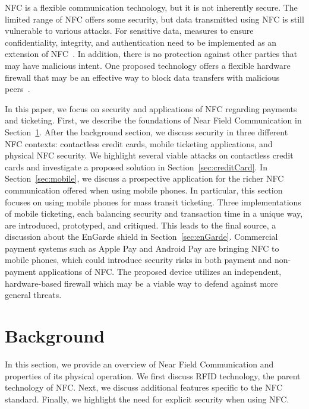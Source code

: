\documentclass{sig-alternate}
\begin{document}
NFC is a flexible communication technology, but it is not inherently secure. The limited range of NFC offers some security, but data transmitted using NFC is still vulnerable to various attacks. For sensitive data, measures to ensure confidentiality, integrity, and authentication need to be implemented as an extension of NFC~\cite{CC2016}. In addition, there is no protection against other parties that may have malicious intent. One proposed technology offers a flexible hardware firewall that may be an effective way to block data transfers with malicious peers~\cite{Gum2013}.

In this paper, we focus on security and applications of NFC regarding payments and ticketing. First, we describe the foundations of Near Field Communication in Section~\ref{sec:background}. After the background section, we discuss security in three different NFC contexts: contactless credit cards, mobile ticketing applications, and physical NFC security.
We highlight several viable attacks on
contactless credit cards and investigate a proposed solution in Section~\ref{sec:creditCard}.
In Section~\ref{sec:mobile}, we discuss a prospective application for the richer NFC communication offered when using mobile phones. In particular, this section focuses on  using mobile phones for mass transit ticketing. Three implementations of mobile ticketing, each balancing security and transaction time in a unique way, are introduced, prototyped, and critiqued.
This leads to the final source, a discussion about the EnGarde shield in Section~\ref{sec:enGarde}. Commercial payment systems such as Apple Pay and Android Pay are bringing NFC to mobile phones, which could introduce security risks in both payment and non-payment applications of NFC. The proposed device utilizes an independent, hardware-based firewall which may be a viable way to defend against more general threats.


\section{Background}
\label{sec:background}
In this section, we provide an overview of Near Field Communication and properties of its physical operation.  We first discuss RFID technology, the parent technology of NFC. Next, we discuss additional features specific to the NFC standard.
Finally, we highlight the need for explicit security when using NFC.
\end{document}
